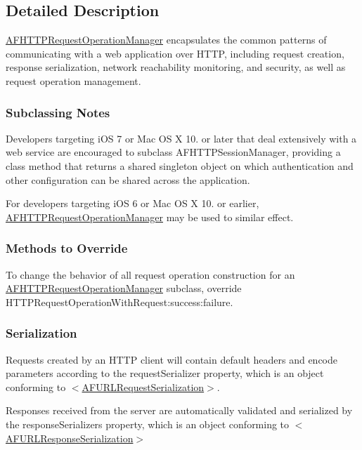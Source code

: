 \subsection{Detailed Description}
{\ttfamily \mbox{\hyperlink{interface_a_f_h_t_t_p_request_operation_manager}{A\+F\+H\+T\+T\+P\+Request\+Operation\+Manager}}} encapsulates the common patterns of communicating with a web application over H\+T\+TP, including request creation, response serialization, network reachability monitoring, and security, as well as request operation management.

\subsubsection*{Subclassing Notes}

Developers targeting i\+OS 7 or Mac OS X 10. or later that deal extensively with a web service are encouraged to subclass {\ttfamily A\+F\+H\+T\+T\+P\+Session\+Manager}, providing a class method that returns a shared singleton object on which authentication and other configuration can be shared across the application.

For developers targeting i\+OS 6 or Mac OS X 10. or earlier, {\ttfamily \mbox{\hyperlink{interface_a_f_h_t_t_p_request_operation_manager}{A\+F\+H\+T\+T\+P\+Request\+Operation\+Manager}}} may be used to similar effect.

\subsubsection*{Methods to Override}

To change the behavior of all request operation construction for an {\ttfamily \mbox{\hyperlink{interface_a_f_h_t_t_p_request_operation_manager}{A\+F\+H\+T\+T\+P\+Request\+Operation\+Manager}}} subclass, override {\ttfamily H\+T\+T\+P\+Request\+Operation\+With\+Request\+:success\+:failure}.

\subsubsection*{Serialization}

Requests created by an H\+T\+TP client will contain default headers and encode parameters according to the {\ttfamily request\+Serializer} property, which is an object conforming to {\ttfamily $<$\mbox{\hyperlink{class_a_f_u_r_l_request_serialization-p}{A\+F\+U\+R\+L\+Request\+Serialization}}$>$}.

Responses received from the server are automatically validated and serialized by the {\ttfamily response\+Serializers} property, which is an object conforming to {\ttfamily $<$\mbox{\hyperlink{class_a_f_u_r_l_response_serialization-p}{A\+F\+U\+R\+L\+Response\+Serialization}}$>$}

